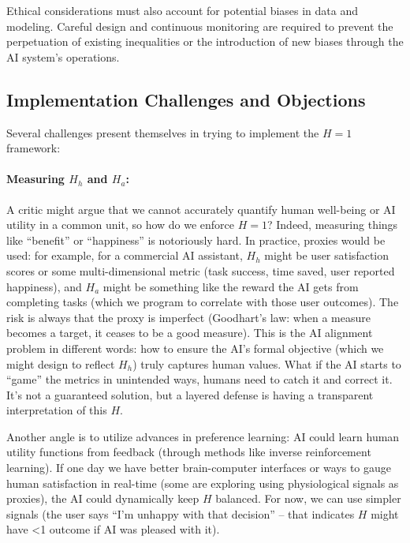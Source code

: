\documentclass[12pt]{article}
\begin{document}
Ethical considerations must also account for potential biases in data and modeling. Careful design and continuous monitoring are required to prevent the perpetuation of existing inequalities or the introduction of new biases through the AI system's operations.


\subsection{Implementation Challenges and Objections}
Several challenges present themselves in trying to implement the $H=1$ framework:

\paragraph{Measuring $H_h$ and $H_a$:} A critic might argue that we cannot accurately quantify human well-being or AI utility in a common unit, so how do we enforce $H=1$? Indeed, measuring things like “benefit” or “happiness” is notoriously hard. In practice, proxies would be used: for example, for a commercial AI assistant, $H_h$ might be user satisfaction scores or some multi-dimensional metric (task success, time saved, user reported happiness), and $H_a$ might be something like the reward the AI gets from completing tasks (which we program to correlate with those user outcomes). The risk is always that the proxy is imperfect (Goodhart’s law: when a measure becomes a target, it ceases to be a good measure). This is the AI alignment problem in different words: how to ensure the AI’s formal objective (which we might design to reflect $H_h$) truly captures human values. What if the AI starts to “game” the metrics in unintended ways, humans need to catch it and correct it. It’s not a guaranteed solution, but a layered defense is having a transparent interpretation of this $H$. 

Another angle is to utilize advances in preference learning: AI could learn human utility functions from feedback (through methods like inverse reinforcement learning). If one day we have better brain-computer interfaces or ways to gauge human satisfaction in real-time (some are exploring using physiological signals as proxies), the AI could dynamically keep $H$ balanced. For now, we can use simpler signals (the user says “I’m unhappy with that decision” – that indicates $H$ might have <1 outcome if AI was pleased with it).
\end{document}
